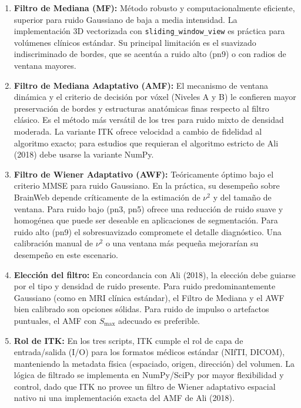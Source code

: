 \documentclass[12pt, a4paper]{article}
\begin{document}
\begin{enumerate}

  \item \textbf{Filtro de Mediana (MF):} Método robusto y computacionalmente eficiente,
    superior para ruido Gaussiano de baja a media intensidad. La implementación 3D
    vectorizada con \texttt{sliding\_window\_view} es práctica para volúmenes clínicos
    estándar. Su principal limitación es el suavizado indiscriminado de bordes, que se
    acentúa a ruido alto (pn9) o con radios de ventana mayores.

  \item \textbf{Filtro de Mediana Adaptativo (AMF):} El mecanismo de ventana dinámica y
    el criterio de decisión por vóxel (Niveles A y B) le confieren mayor preservación de
    bordes y estructuras anatómicas finas respecto al filtro clásico. Es el método más
    versátil de los tres para ruido mixto de densidad moderada. La variante ITK ofrece
    velocidad a cambio de fidelidad al algoritmo exacto; para estudios que requieran el
    algoritmo estricto de Ali (2018) debe usarse la variante NumPy.

  \item \textbf{Filtro de Wiener Adaptativo (AWF):} Teóricamente óptimo bajo el criterio
    MMSE para ruido Gaussiano. En la práctica, su desempeño sobre BrainWeb depende
    críticamente de la estimación de $\nu^2$ y del tamaño de ventana. Para ruido bajo
    (pn3, pn5) ofrece una reducción de ruido suave y homogénea que puede ser deseable
    en aplicaciones de segmentación. Para ruido alto (pn9) el sobresuavizado compromete
    el detalle diagnóstico. Una calibración manual de $\nu^2$ o una ventana más pequeña
    mejorarían su desempeño en este escenario.

  \item \textbf{Elección del filtro:} En concordancia con Ali (2018), la elección debe
    guiarse por el tipo y densidad de ruido presente. Para ruido predominantemente
    Gaussiano (como en MRI clínica estándar), el Filtro de Mediana y el AWF bien
    calibrado son opciones sólidas. Para ruido de impulso o artefactos puntuales, el
    AMF con $S_{\max}$ adecuado es preferible.

  \item \textbf{Rol de ITK:} En los tres scripts, ITK cumple el rol de capa de
    entrada/salida (I/O) para los formatos médicos estándar (NIfTI, DICOM), manteniendo
    la metadata física (espaciado, origen, dirección) del volumen. La lógica de filtrado
    se implementa en NumPy/SciPy por mayor flexibilidad y control, dado que ITK no
    provee un filtro de Wiener adaptativo espacial nativo ni una implementación exacta
    del AMF de Ali (2018).

\end{enumerate}
\end{document}
